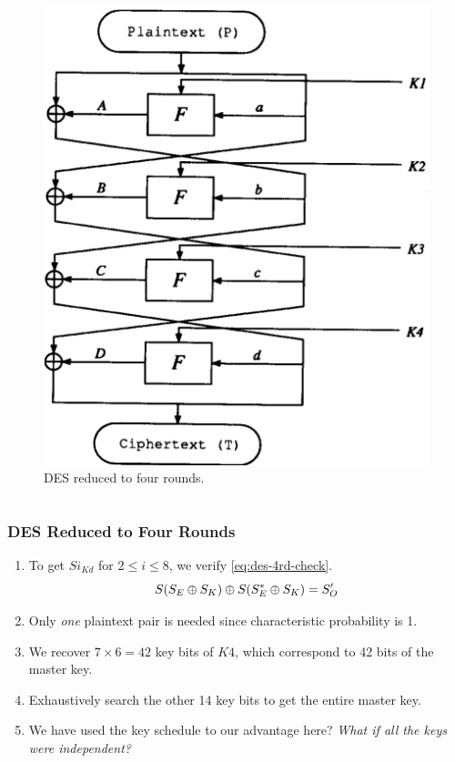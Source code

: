 \documentclass{beamer}
\begin{document}
\begin{frame}
\begin{columns}
\begin{column}{0.35\textwidth}
\begin{figure}[!ht]
                    \includegraphics[width=\columnwidth]{images/des_4round.png}
                    \caption{DES reduced to four rounds.}
                    \label{fig:des-four}
                \end{figure}
            \end{column}
        \end{columns}
    \end{frame}

    \begin{frame}
        \frametitle{DES Reduced to Four Rounds}
        \begin{enumerate}
            \item<1-> To get \(Si_{Kd}\) for \(2 \le i \le 8\), we verify
            \eqref{eq:des-4rd-check}.
            \begin{equation}
                S(S_{E} \oplus S_{K}) \oplus S(S_{E}^* \oplus S_{K}) = S_{O}^\prime
                \label{eq:des-4rd-check}
            \end{equation}
            \item Only \emph{one} plaintext pair is needed since characteristic
            probability is 1.
            \item We recover \(7 \times 6 = 42\) key bits of \(K4\), which
            correspond to 42 bits of the master key.
            \item Exhaustively search the other 14 key bits to get the entire
            master key.
            \item We have used the key schedule to our advantage here?
            \emph{What if all the keys were independent?}
        \end{enumerate}
    \end{frame}
\end{document}
